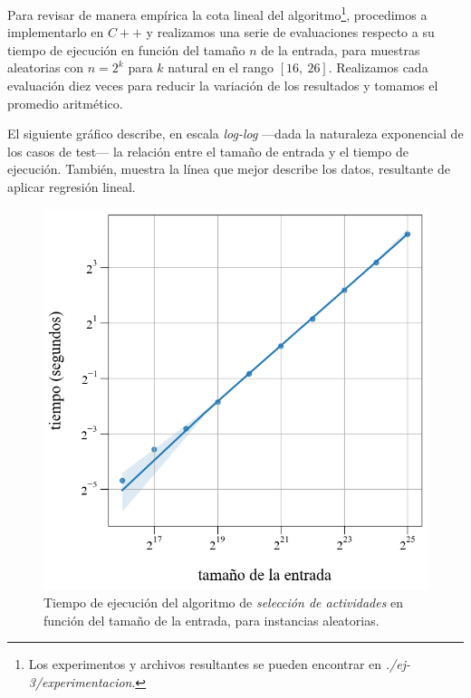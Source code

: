 \vspace{1em}
Para revisar de manera empírica la cota lineal del algoritmo\footnote{Los experimentos y archivos resultantes se pueden encontrar en \textit{./ej-3/experimentacion}.}, procedimos a implementarlo en $C++$ y realizamos una serie de evaluaciones respecto a su tiempo de ejecución en función del tamaño $n$ de la entrada, para muestras aleatorias con $n = 2^k$ para $k$ natural en el rango $[16,\ 26]$. Realizamos cada evaluación diez veces para reducir la variación de los resultados y tomamos el promedio aritmético. 

El siguiente gráfico describe, en escala \textit{log-log} ---dada la naturaleza exponencial de los casos de test--- la relación entre el tamaño de entrada y el tiempo de ejecución. También, muestra la línea que mejor describe los datos, resultante de aplicar regresión lineal.  
\begin{figure}[!htbp]
    \includegraphics[scale=0.5, clip]{./files/src/.media/aleatorio.png}
    \caption{Tiempo de ejecución del algoritmo de \textit{selección de actividades} en función del tamaño de la entrada, para instancias aleatorias.} \label{aleatorio}
\end{figure}

